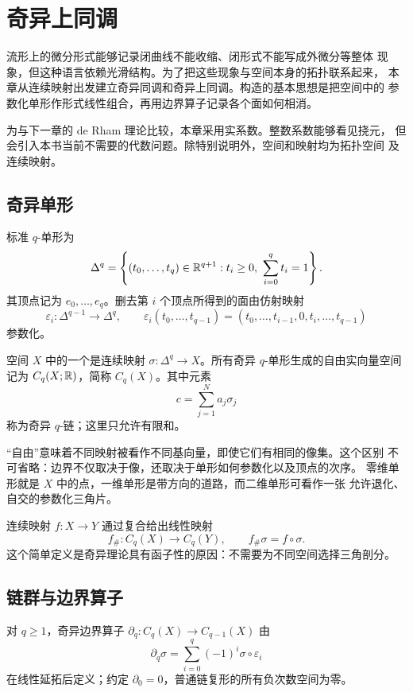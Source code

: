 \chapter{奇异上同调}
\label{chap:singular-cohomology}

流形上的微分形式能够记录闭曲线不能收缩、闭形式不能写成外微分等整体
现象，但这种语言依赖光滑结构。为了把这些现象与空间本身的拓扑联系起来，
本章从连续映射出发建立奇异同调和奇异上同调。构造的基本思想是把空间中的
参数化单形作形式线性组合，再用边界算子记录各个面如何相消。

为与下一章的 de Rham 理论比较，本章采用实系数。整数系数能够看见挠元，
但会引入本书当前不需要的代数问题。除特别说明外，空间和映射均为拓扑空间
及连续映射。

\section{奇异单形}

标准 $q$-单形为
\[
 \Delta^q=\left\{(t_0,\ldots,t_q)\in\mathbb{R}^{q+1}:
 t_i\ge0,\ \sum_{i=0}^qt_i=1\right\}.
\]
其顶点记为 $e_0,\ldots,e_q$。删去第 $i$ 个顶点所得到的面由仿射映射
\[
 \varepsilon_i:\Delta^{q-1}\longrightarrow\Delta^q,
 \qquad
 \varepsilon_i(t_0,\ldots,t_{q-1})
 =(t_0,\ldots,t_{i-1},0,t_i,\ldots,t_{q-1})
\]
参数化。

\begin{definition}
空间 $X$ 中的一个是连续映射
$\sigma:\Delta^q\to X$。所有奇异 $q$-单形生成的自由实向量空间记为
$C_q(X;\mathbb{R})$，简称 $C_q(X)$。其中元素
\[
 c=\sum_{j=1}^N a_j\sigma_j
\]
称为奇异 $q$-链；这里只允许有限和。
\end{definition}

“自由”意味着不同映射被看作不同基向量，即使它们有相同的像集。这个区别
不可省略：边界不仅取决于像，还取决于单形如何参数化以及顶点的次序。
零维单形就是 $X$ 中的点，一维单形是带方向的道路，而二维单形可看作一张
允许退化、自交的参数化三角片。

连续映射 $f:X\to Y$ 通过复合给出线性映射
\[
 f_\#:C_q(X)\to C_q(Y),\qquad f_\#\sigma=f\circ\sigma.
\]
这个简单定义是奇异理论具有函子性的原因：不需要为不同空间选择三角剖分。

\section{链群与边界算子}

\begin{definition}
对 $q\ge1$，奇异边界算子 $\partial_q:C_q(X)\to C_{q-1}(X)$ 由
\[
 \partial_q\sigma=\sum_{i=0}^q(-1)^i\sigma\circ\varepsilon_i
\]
在线性延拓后定义；约定 $\partial_0=0$，普通链复形的所有负次数空间为零。
\end{definition}

